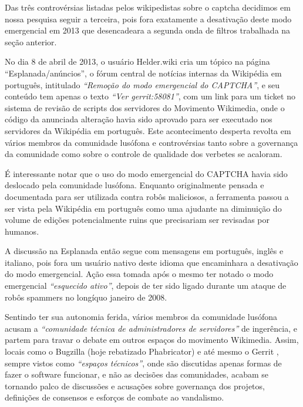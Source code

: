 Das três controvérsias listadas pelos wikipedistas sobre o captcha decidimos em nossa pesquisa seguir a terceira, pois fora exatamente a desativação deste modo emergencial em 2013 que desencadeara a segunda onda de filtros trabalhada na seção anterior.


No dia 8 de abril de 2013, o usuário Helder.wiki cria um tópico na página ``Esplanada/anúncios'', o fórum central de notícias internas da Wikipédia em português, intitulado \textit{``Remoção do modo emergencial do CAPTCHA''}, e seu conteúdo tem apenas o texto \textit{``Ver gerrit:58081''}, com um link para um ticket no sistema de revisão de scripts dos servidores do Movimento Wikimedia, onde o código da anunciada alteração havia sido aprovado para ser executado nos servidores da Wikipédia em português. Este acontecimento desperta revolta em vários membros da comunidade lusófona e controvérsias tanto sobre a governança da comunidade como sobre o controle de qualidade dos verbetes se acaloram. 

É interessante notar que o uso do modo emergencial do CAPTCHA havia sido deslocado pela comunidade lusófona. Enquanto originalmente pensada e documentada para ser utilizada contra robôs maliciosos, a ferramenta passou a ser vista pela Wikipédia em português como uma ajudante na diminuição do volume de edições potencialmente ruins que precisariam ser revisadas por humanos.

A discussão na Esplanada então segue com mensagens em português, inglês e italiano, pois fora um usuário nativo deste idioma que encaminhara a desativação do modo emergencial. Ação essa tomada após o mesmo ter notado o modo emergencial \textit{“esquecido ativo”}, depois de ter sido ligado durante um ataque de robôs spammers no longíquo janeiro de 2008.

Sentindo ter sua autonomia ferida, vários membros da comunidade lusófona acusam a \textit{“comunidade técnica de administradores de servidores”} de ingerência, e partem para travar o debate em outros espaços do movimento Wikimedia. Assim, locais como o Bugzilla (hoje rebatizado Phabricator) \citep{remove_ptwiki_ptwikinews_captcha_mode} e até mesmo o Gerrit , sempre vistos como \textit{``espaços técnicos''}, onde são discutidas apenas formas de fazer o software funcionar, e não as decisões das comunidades, acabam se tornando palco de discussões e acusações sobre governança dos projetos, definições de consensos e esforços de combate ao vandalismo.  

